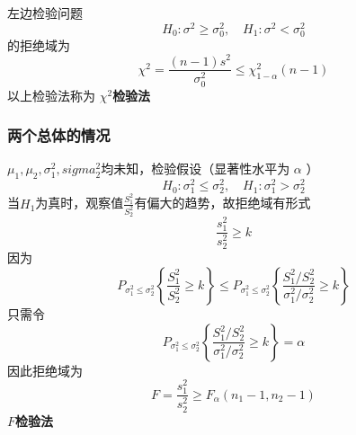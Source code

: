 \documentclass[11pt]{article}
\begin{document}
左边检验问题
\begin{equation*}
H_0:\sigma^2\ge\sigma_0^2,\quad H_1:\sigma^2<\sigma_0^2
\end{equation*}
的拒绝域为
\begin{equation*}
\chi^2=\frac{(n-1)s^2}{\sigma_0^2}\le\chi_{1-\alpha}^2(n-1)
\end{equation*}
以上检验法称为 \textbf{\(\chi^2\)检验法}
\subsubsection{两个总体的情况}
\label{sec:org99e58be}
\(\mu_1,\mu_2,\sigma^2_1,sigma^2_2\)均未知，检验假设（显著性水平为 \(\alpha\) ）
\begin{equation*}
H_0:\sigma_1^2\le\sigma_2^2,\quad H_1:\sigma_1^2>\sigma_2^2
\end{equation*}
当\(H_1\)为真时，观察值\(\frac{S_1^2}{S_2^2}\)有偏大的趋势，故拒绝域有形式
\begin{equation*}
\frac{s_1^2}{s_2^2}\ge k
\end{equation*}
因为
\begin{equation*}
P_{\sigma_1^2\le\sigma_2^2}\left\{\frac{S_1^2}{S_2^2}\ge k\right\}\le
P_{\sigma_1^2\le\sigma_2^2}\left\{\frac{S_1^2/S_2^2}{\sigma_1^2/\sigma_2^2}\ge k\right\}
\end{equation*}
只需令
\begin{equation*}
P_{\sigma_1^2\le\sigma_2^2}\left\{\frac{S_1^2/S_2^2}{\sigma_1^2/\sigma_2^2}\ge k\right\}
=\alpha
\end{equation*}
因此拒绝域为
\begin{equation*}
F=\frac{s_1^2}{s_2^2}\ge F_{\alpha}(n_1-1,n_2-1)
\end{equation*}
\textbf{\(F\)检验法}
\end{document}
